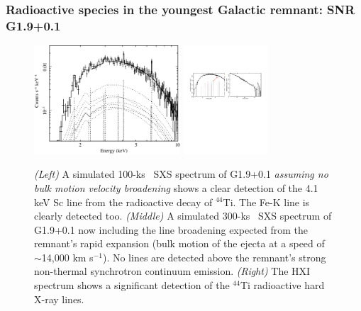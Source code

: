 \documentclass[11pt,a4paper]{article}
\begin{document}
{\subsubsection{Radioactive species in the youngest 
Galactic remnant: SNR G1.9+0.1 } \label{subsec:g1p9}

\begin{figure}[h]
\begin{center}
\includegraphics[height=1.6in]{g1_9_100ks.pdf}
\includegraphics[height=1.6in]{g1p9_SXS+HXI.pdf}
\caption{{\it (Left)} A simulated 100-ks \ah\ SXS spectrum of G1.9+0.1
  {\it assuming no bulk motion velocity broadening} shows a clear
  detection of the 4.1 keV Sc line from the radioactive decay of
  $^{44}$Ti.  The Fe-K line is clearly detected too. {\it (Middle)} A
  simulated 300-ks \ah\ SXS spectrum of G1.9+0.1 now including the
  line broadening expected from the remnant's rapid expansion (bulk
  motion of the ejecta at a speed of $\sim$14,000 km s$^{-1}$).  No
  lines are detected above the remnant's strong non-thermal synchrotron
  continuum emission.  {\it (Right)} The HXI spectrum shows a
  significant detection of the $^{44}$Ti radioactive hard X-ray lines.
}
\label{fig:g1p9sxs}
\end{center}
\end{figure}

}
\end{document}
